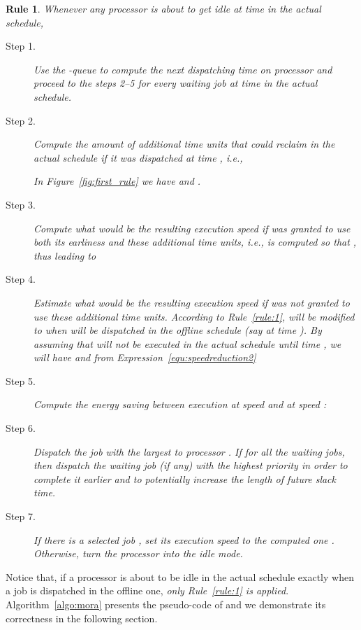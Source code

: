 \documentclass[times, 10pt,twocolumn]{article}
\newtheorem{Rule}{Rule}
\begin{document}
\begin{small}
\begin{Rule}
\label{rule:2}
Whenever any processor  is about to get idle at time  in the actual schedule,
\begin{description}
\item[Step 1.] Use the -queue to compute the next dispatching time  on processor  and proceed to the steps 2--5 for every waiting job  at time  in the actual schedule.
\item[Step 2.] Compute the amount  of additional time units that  could reclaim in the actual schedule if it was dispatched at time , i.e.,

In Figure~\ref{fig:first_rule} we have  and  . 
\item[Step 3.] Compute what would be the resulting execution speed  if  was granted to use both its earliness and these  additional time units, i.e.,  is computed so that , thus leading to

\item[Step 4.] Estimate what would be the resulting execution speed  if  was not granted to use these  additional time units. According to Rule~\ref{rule:1},  will be modified to  when  will be dispatched in the offline schedule (say at time ). By assuming that  will not be executed in the actual schedule until time , we will have  and from Expression~\ref{equ:speedreduction2}

\item[Step 5.] Compute the energy saving  between execution at speed  and at speed :

\item[Step 6.] Dispatch the job  with the largest  to processor . If  for all the waiting jobs, then dispatch the waiting job  (if any) with the highest priority in order to complete it earlier and to potentially increase the length of future slack time. 
\item[Step 7.]  If there is a selected job , set its execution speed  to the computed one . Otherwise, turn the processor  into the idle mode.
\end{description}
\end{Rule}
\end{small}


Notice that, if a processor is about to be idle in the actual schedule exactly when a job is dispatched in the offline one, \emph{only Rule~\ref{rule:1} is applied}. Algorithm~\ref{algo:mora} presents the pseudo-code of  and we demonstrate its correctness in the following section. 
\end{document}
